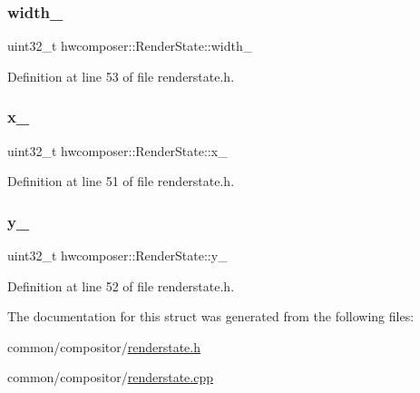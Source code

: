 \subsubsection{\texorpdfstring{width\+\_\+}{width\_}}
{\footnotesize\ttfamily uint32\+\_\+t hwcomposer\+::\+Render\+State\+::width\+\_\+}



Definition at line 53 of file renderstate.\+h.

\mbox{\label{structhwcomposer_1_1RenderState_ac7277dd3c8238665f4fd1095576c335a}} 
\subsubsection{\texorpdfstring{x\+\_\+}{x\_}}
{\footnotesize\ttfamily uint32\+\_\+t hwcomposer\+::\+Render\+State\+::x\+\_\+}



Definition at line 51 of file renderstate.\+h.

\mbox{\label{structhwcomposer_1_1RenderState_a6076ef9b49604c76ae1597ec760fa78a}} 
\subsubsection{\texorpdfstring{y\+\_\+}{y\_}}
{\footnotesize\ttfamily uint32\+\_\+t hwcomposer\+::\+Render\+State\+::y\+\_\+}



Definition at line 52 of file renderstate.\+h.



The documentation for this struct was generated from the following files\+:\begin{DoxyCompactItemize}
\item 
common/compositor/\mbox{\hyperlink{renderstate_8h}{renderstate.\+h}}\item 
common/compositor/\mbox{\hyperlink{renderstate_8cpp}{renderstate.\+cpp}}\end{DoxyCompactItemize}
